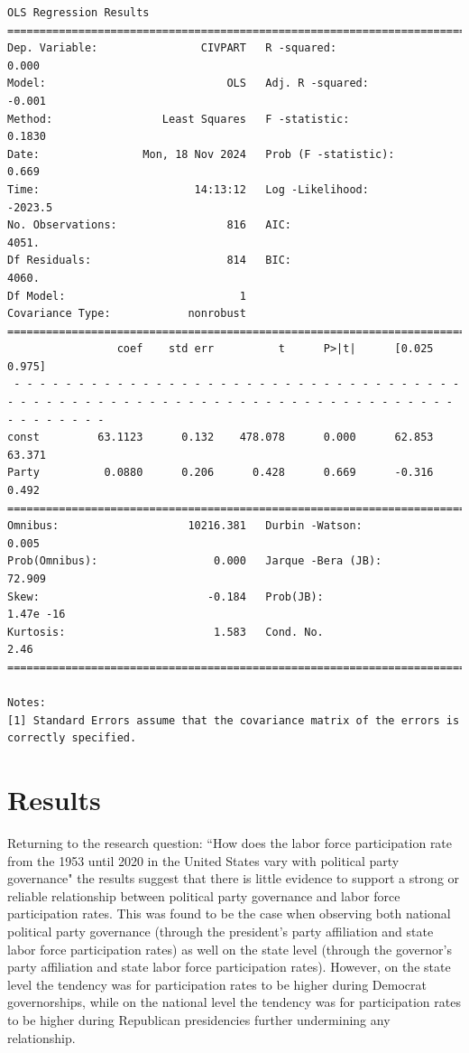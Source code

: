 \begin{verbatim}
OLS Regression Results                            
==============================================================================
Dep. Variable:                CIVPART   R -squared:                       0.000
Model:                            OLS   Adj. R -squared:                 -0.001
Method:                 Least Squares   F -statistic:                    0.1830
Date:                Mon, 18 Nov 2024   Prob (F -statistic):              0.669
Time:                        14:13:12   Log -Likelihood:                -2023.5
No. Observations:                 816   AIC:                             4051.
Df Residuals:                     814   BIC:                             4060.
Df Model:                           1                                         
Covariance Type:            nonrobust                                         
==============================================================================
                 coef    std err          t      P>|t|      [0.025      0.975]
 - - - - - - - - - - - - - - - - - - - - - - - - - - - - - - - - - - - - - - - - - - - - - - - - - - - - - - - - - - - - - - - - - - - - - - - - - - - - - -
const         63.1123      0.132    478.078      0.000      62.853      63.371
Party          0.0880      0.206      0.428      0.669      -0.316       0.492
==============================================================================
Omnibus:                    10216.381   Durbin -Watson:                   0.005
Prob(Omnibus):                  0.000   Jarque -Bera (JB):               72.909
Skew:                          -0.184   Prob(JB):                     1.47e -16
Kurtosis:                       1.583   Cond. No.                         2.46
==============================================================================

Notes:
[1] Standard Errors assume that the covariance matrix of the errors is correctly specified.
\end{verbatim}

\section{Results}

Returning to the research question: ``How does the labor force participation rate from the 1953 until 2020 in the United States vary with political party governance" the results suggest that there is little evidence to support a strong or reliable relationship between political party governance and labor force participation rates. This was found to be the case when observing both national political party governance (through the president's party affiliation and state labor force participation rates) as well on the state level (through the governor's party affiliation and state labor force participation rates). However, on the state level the tendency was for participation rates to be higher during Democrat governorships, while on the national level the tendency was for participation rates to be higher during Republican presidencies further undermining any relationship.

